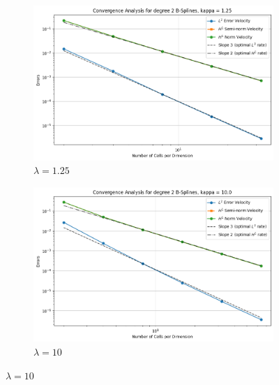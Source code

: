 \documentclass[a4paper,12pt,twoside]{report}
\begin{document}
\begin{figure}[!h]
	\centering
	\begin{subfigure}[b]{0.49\textwidth}
		\centering
		\includegraphics[width=\textwidth]{convergence_degree_2_non_mixed_kappa=1.25}
		\caption{$\lambda=1.25$}
	\end{subfigure}
	\begin{subfigure}[b]{0.49\textwidth}
		\centering
		\includegraphics[width=\textwidth]{convergence_degree_2_non_mixed_kappa=10.0}
		\caption{$\lambda=10$}
	\end{subfigure}
\end{figure}
\end{document}

